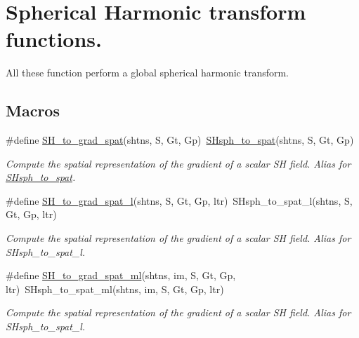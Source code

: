 \hypertarget{group__sht}{}\section{Spherical Harmonic transform functions.}
\label{group__sht}


All these function perform a global spherical harmonic transform.  


\subsection*{Macros}
\begin{DoxyCompactItemize}
\item 
\hypertarget{group__sht_ga9e013843483dd0523c913300d9db5da6}{}\#define \hyperlink{group__sht_ga9e013843483dd0523c913300d9db5da6}{S\+H\+\_\+to\+\_\+grad\+\_\+spat}(shtns,  S,  Gt,  Gp)~\hyperlink{group__sht_ga665f43382fa5fc22b63ebcd8d9a0cf71}{S\+Hsph\+\_\+to\+\_\+spat}(shtns, S, Gt, Gp)\label{group__sht_ga9e013843483dd0523c913300d9db5da6}

\begin{DoxyCompactList}\small\item\em Compute the spatial representation of the gradient of a scalar S\+H field. Alias for \hyperlink{group__sht_ga665f43382fa5fc22b63ebcd8d9a0cf71}{S\+Hsph\+\_\+to\+\_\+spat}. \end{DoxyCompactList}\item 
\hypertarget{group__sht_gaf91985a54c71208a97f80621fb88be23}{}\#define \hyperlink{group__sht_gaf91985a54c71208a97f80621fb88be23}{S\+H\+\_\+to\+\_\+grad\+\_\+spat\+\_\+l}(shtns,  S,  Gt,  Gp,  ltr)~S\+Hsph\+\_\+to\+\_\+spat\+\_\+l(shtns, S, Gt, Gp, ltr)\label{group__sht_gaf91985a54c71208a97f80621fb88be23}

\begin{DoxyCompactList}\small\item\em Compute the spatial representation of the gradient of a scalar S\+H field. Alias for S\+Hsph\+\_\+to\+\_\+spat\+\_\+l. \end{DoxyCompactList}\item 
\hypertarget{group__sht_gaced9b8d9b2d1bfc91004d8c6f288c1f5}{}\#define \hyperlink{group__sht_gaced9b8d9b2d1bfc91004d8c6f288c1f5}{S\+H\+\_\+to\+\_\+grad\+\_\+spat\+\_\+ml}(shtns,  im,  S,  Gt,  Gp,  ltr)~S\+Hsph\+\_\+to\+\_\+spat\+\_\+ml(shtns, im, S, Gt, Gp, ltr)\label{group__sht_gaced9b8d9b2d1bfc91004d8c6f288c1f5}

\begin{DoxyCompactList}\small\item\em Compute the spatial representation of the gradient of a scalar S\+H field. Alias for S\+Hsph\+\_\+to\+\_\+spat\+\_\+l. \end{DoxyCompactList}\end{DoxyCompactItemize}
